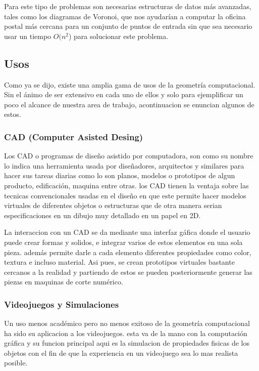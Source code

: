\documentclass[final, 12pt letterpaper]{article}
\begin{document}
Para este tipo de problemas son necesarias estructuras de datos más avanzadas, tales como los diagramas de Voronoi, que nos ayudarían a computar la oficina postal más cercana para un conjunto de puntos de entrada sin que sea necesario usar un tiempo $O(n^2$) para solucionar este problema.

\subsection{Usos}

Como ya se dijo, existe una amplia gama de usos de la geometría computacional. Sin el ánimo de ser extensivo en cada uno de ellos y solo para ejemplificar un poco el alcance de nuestra area de trabajo, acontinuacion se enuncian algunos de estos.

\subsubsection*{CAD (Computer Asisted Desing)}
Los CAD o programas de diseño asistido por computadora, son como su nombre lo indica una herramienta usada por diseñadores, arquitectos y similares para hacer sus tareas diarias como lo son planos, modelos o prototipos de algun producto, edificación, maquina entre otras.
los CAD tienen la ventaja sobre las tecnicas convencionales usadas en el diseño en que este permite hacer modelos virtuales de diferentes objetos o estructuras que de otra manera serian especificaciones en un dibujo muy detallado en un papel en 2D.

La interaccion con un CAD se da mediante una interfaz gáfica donde el usuario puede crear formas y solidos, e integrar varios de estos elementos en una sola pieza. además permite darle a cada elemento diferentes propiedades como color, textura e incluso material.
Asi pues, se crean prototipos virtuales bastante cercanos a la realidad y partiendo de estos se pueden posteriormente generar las piezas en maquinas de corte numérico.

\subsubsection*{Videojuegos y Simulaciones}
Un uso menos académico pero no menos exitoso de la geometría computacional ha sido su aplicacion a los videojuegos. esta va de la mano con la computación gráfica y su funcion principal aqui es la simulacion de propiedades fisicas de los objetos con el fin de que la experiencia en un videojuego sea lo mas realista posible.
\end{document}
